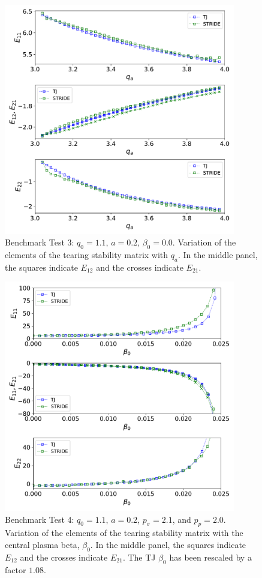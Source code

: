 \documentclass[12pt,prb,aps]{revtex4-1}
\begin{document}
\newpage
\begin{figure}
\centerline{\includegraphics[width=0.9\textwidth]{Test3.pdf}}
\caption{Benchmark Test 3: $q_0=1.1$, $a=0.2$, $\beta_0=0.0$. Variation of the elements of the tearing stability matrix with $q_a$. In the middle panel, the squares
indicate  $E_{12}$ and the crosses indicate $E_{21}$. }
\end{figure}

\newpage
\begin{figure}
\centerline{\includegraphics[width=0.9\textwidth]{Test4.pdf}}
\caption{Benchmark Test 4: $q_0=1.1$, $a=0.2$, $p_\sigma=2.1$,  and $p_p=2.0$. Variation of the elements of the tearing stability matrix with the central plasma beta,  $\beta_0$. In the middle panel, the squares
indicate  $E_{12}$ and the crosses indicate $E_{21}$. The TJ $\beta_0$ has been rescaled by a factor $1.08$.}
\end{figure}
\end{document}

